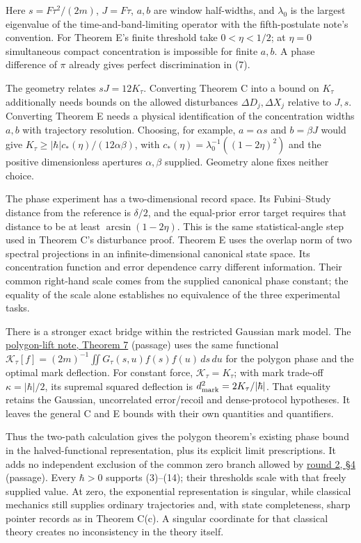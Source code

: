 \documentclass[11pt,a4paper]{article}
\begin{document}
Here \(s=F\tau^2/(2m)\), \(J=F\tau\), \(a,b\) are window half-widths,
and \(\lambda_0\) is the largest eigenvalue of the
time-and-band-limiting operator with the fifth-postulate note's
convention. For Theorem E's finite threshold take \(0<\eta<1/2\); at
\(\eta=0\) simultaneous compact concentration is impossible for finite
\(a,b\). A phase difference of \(\pi\) already gives perfect
discrimination in (7).

The geometry relates \(sJ=12K_\tau\). Converting Theorem C into a bound
on \(K_\tau\) additionally needs bounds on the allowed disturbances
\(\Delta D_j,\Delta X_j\) relative to \(J,s\). Converting Theorem E
needs a physical identification of the concentration widths \(a,b\) with
trajectory resolution. Choosing, for example, \(a=\alpha s\) and
\(b=\beta J\) would give \(K_\tau\ge|\hbar|c_*(\eta)/(12\alpha\beta)\),
with \(c_*(\eta)=\lambda_0^{-1}((1-2\eta)^2)\) and the positive
dimensionless apertures \(\alpha,\beta\) supplied. Geometry alone fixes
neither choice.

The phase experiment has a two-dimensional record space. Its
Fubini--Study distance from the reference is \(\delta/2\), and the
equal-prior error target requires that distance to be at least
\(\arcsin(1-2\eta)\). This is the same statistical-angle step used in
Theorem C's disturbance proof. Theorem E uses the overlap norm of two
spectral projections in an infinite-dimensional canonical state space.
Its concentration function and error dependence carry different
information. Their common right-hand scale comes from the supplied
canonical phase constant; the equality of the scale alone establishes no
equivalence of the three experimental tasks.

There is a stronger exact bridge within the restricted Gaussian mark
model. The
\href{cut-measure-newton.md\#weyl-lifting-and-polygon-phases}{polygon-lift
note, Theorem 7} (passage) uses the same functional
\(\mathcal K_\tau[f]=(2m)^{-1}\iint G_\tau(s,u)f(s)f(u)\,ds\,du\) for
the polygon phase and the optimal mark deflection. For constant force,
\(\mathcal K_\tau=K_\tau\); with mark trade-off \(\kappa=|\hbar|/2\),
its supremal squared deflection is \(d_{\rm mark}^2=2K_\tau/|\hbar|\).
That equality retains the Gaussian, uncorrelated error/recoil and
dense-protocol hypotheses. It leaves the general C and E bounds with
their own quantities and quantifiers.

Thus the two-path calculation gives the polygon theorem's existing phase
bound in the halved-functional representation, plus its explicit limit
prescriptions. It adds no independent exclusion of the common zero
branch allowed by \href{rotation-composition-universality.md}{round 2,
§4} (passage). Every \(\hbar>0\) supports (3)--(14); their thresholds
scale with that freely supplied value. At zero, the exponential
representation is singular, while classical mechanics still supplies
ordinary trajectories and, with state completeness, sharp pointer
records as in Theorem C(c). A singular coordinate for that classical
theory creates no inconsistency in the theory itself.
\end{document}
